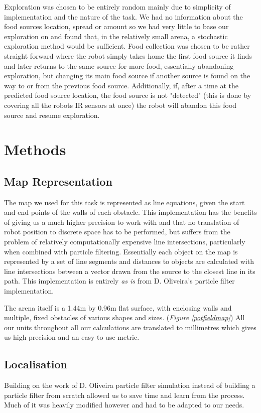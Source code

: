 \documentclass[paper=a4, fontsize=12pt]{scrartcl}	%
\numberwithin{equation}{section}		%
\numberwithin{figure}{section}			%
\numberwithin{table}{section}				%
\begin{document}
Exploration was chosen to be entirely random mainly due to simplicity of implementation and the nature of the task. We had no information about the food sources location, spread or amount so we had very little to base our exploration on and found that, in the relatively small arena, a stochastic exploration method would be sufficient. Food collection was chosen to be rather straight forward where the robot simply takes home the first food source it finds and later returns to the same source for more food, essentially abandoning exploration, but changing its main food source if another source is found on the way to or from the previous food source. Additionally, if, after a time at the predicted food source location, the food source is not "detected" (this is done by covering all the robots IR sensors at once) the robot will abandon this food source and resume exploration.

\section{Methods} 
\subsection{Map Representation}
The map we used for this task is represented as line equations, given the start and end points of the walls of each obstacle. This implementation has the benefits of giving us a much higher precision to work with and that no translation of robot position to discrete space has to be performed, but suffers from the problem of relatively computationally expensive line intersections, particularly when combined with particle filtering. Essentially each object on the map is represented by a set of line segments and distances to objects are calculated with line intersections between a vector drawn from the source to the closest line in its path. This implementation is entirely \emph{as is} from D. Oliveira's particle filter implementation.\cite{oliveira}

The arena itself is a 1.44m by 0.96m flat surface, with enclosing walls and multiple, fixed obstacles of various shapes and sizes. (\emph{Figure  \ref{potfieldmap}}) All our units throughout all our calculations are translated to millimetres which gives us high precision and an easy to use metric.

\subsection{Localisation}
Building on the work of D. Oliveira particle filter simulation instead of building a particle filter from scratch allowed us to save time and learn from the process. Much of it was heavily modified however and had to be adapted to our needs.
\end{document}

